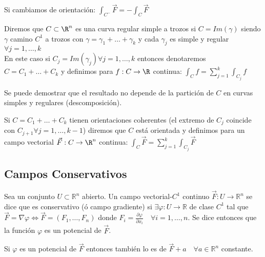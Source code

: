 \begin{observación}
Si cambiamos de orientación: $\int_{C^-} \vec{F} = -\int_{C} \vec{F}$
\end{observación}

\begin{definición} 
Diremos que $C \subset \R^n $ es una curva regular simple a trozos si $C = Im(\gamma)$ siendo $\gamma$ camino $C^1$ a trozos con $\gamma = \gamma_1 + \ldots + \gamma_k$ y cada $\gamma_j$ es simple y regular $\forall j = 1, \ldots, k$\\
En este caso si $C_j = Im(\gamma_j) \forall j = 1, \ldots, k$ entonces denotaremos $C = C_1 + \ldots + C_k$ y definimos para $f: C \to \R$ continua: $\int_{C} f = \sum_{j=1}^{k} \int_{C_j} f$
\end{definición}

\begin{observación}
Se puede demostrar que el resultado no depende de la partición de $C$ en curvas simples y regulares (descomposición).
\end{observación}

\begin{observación}
Si $C = C_1 + \ldots + C_k$ tienen orientaciones coherentes (el extremo de $C_j$ coincide con $C_{j+1} \forall j = 1, \ldots, k-1$) diremos que $C$ está orientada y definimos para un campo vectorial $\vec{F}: C \to \R^n$ continua: $\int_{C} \vec{F} = \sum_{j=1}^{k} \int_{C_j} \vec{F}$
\end{observación}

\subsection{Campos Conservativos}

\begin{definición} 
Sea un conjunto $U  \subset \mathbb{R}^n$ abierto. Un campo vectorial-$C^1$ continuo $\vec{F}: U \to \mathbb{R}^n$ se dice que es conservativo (ó campo gradiente) si $\exists \varphi: U \to \mathbb{R}$ de clase $C^1$ tal que $\vec{F} = \nabla \varphi \iff \vec{F} = (F_1, \ldots, F_n)$ donde $F_i = \frac{\partial \varphi}{\partial x_i} \quad \forall i = 1, \ldots, n$.
Se dice entonces que la función $\varphi$ es un potencial de $\vec{F}$.
\end{definición}

\begin{observación}
Si $\varphi$ es un potencial de $\vec{F}$ entonces también lo es de $\vec{F} + a \quad \forall a \in \mathbb{R}^n$ constante.
\end{observación}

